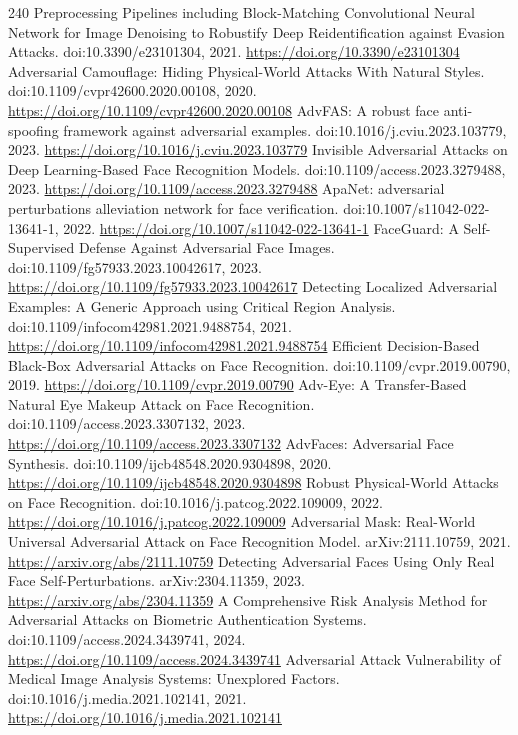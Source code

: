 \documentclass[11pt]{article}
\begin{document}
\begin{thebibliography}{240}
 Preprocessing Pipelines including Block-Matching Convolutional Neural Network for Image Denoising to Robustify Deep Reidentification against Evasion Attacks. doi:10.3390/e23101304, 2021. \url{https://doi.org/10.3390/e23101304}
 Adversarial Camouflage: Hiding Physical-World Attacks With Natural Styles. doi:10.1109/cvpr42600.2020.00108, 2020. \url{https://doi.org/10.1109/cvpr42600.2020.00108}
 AdvFAS: A robust face anti-spoofing framework against adversarial examples. doi:10.1016/j.cviu.2023.103779, 2023. \url{https://doi.org/10.1016/j.cviu.2023.103779}
 Invisible Adversarial Attacks on Deep Learning-Based Face Recognition Models. doi:10.1109/access.2023.3279488, 2023. \url{https://doi.org/10.1109/access.2023.3279488}
 ApaNet: adversarial perturbations alleviation network for face verification. doi:10.1007/s11042-022-13641-1, 2022. \url{https://doi.org/10.1007/s11042-022-13641-1}
 FaceGuard: A Self-Supervised Defense Against Adversarial Face Images. doi:10.1109/fg57933.2023.10042617, 2023. \url{https://doi.org/10.1109/fg57933.2023.10042617}
 Detecting Localized Adversarial Examples: A Generic Approach using Critical Region Analysis. doi:10.1109/infocom42981.2021.9488754, 2021. \url{https://doi.org/10.1109/infocom42981.2021.9488754}
 Efficient Decision-Based Black-Box Adversarial Attacks on Face Recognition. doi:10.1109/cvpr.2019.00790, 2019. \url{https://doi.org/10.1109/cvpr.2019.00790}
 Adv-Eye: A Transfer-Based Natural Eye Makeup Attack on Face Recognition. doi:10.1109/access.2023.3307132, 2023. \url{https://doi.org/10.1109/access.2023.3307132}
 AdvFaces: Adversarial Face Synthesis. doi:10.1109/ijcb48548.2020.9304898, 2020. \url{https://doi.org/10.1109/ijcb48548.2020.9304898}
 Robust Physical-World Attacks on Face Recognition. doi:10.1016/j.patcog.2022.109009, 2022. \url{https://doi.org/10.1016/j.patcog.2022.109009}
 Adversarial Mask: Real-World Universal Adversarial Attack on Face Recognition Model. arXiv:2111.10759, 2021. \url{https://arxiv.org/abs/2111.10759}
 Detecting Adversarial Faces Using Only Real Face Self-Perturbations. arXiv:2304.11359, 2023. \url{https://arxiv.org/abs/2304.11359}
 A Comprehensive Risk Analysis Method for Adversarial Attacks on Biometric Authentication Systems. doi:10.1109/access.2024.3439741, 2024. \url{https://doi.org/10.1109/access.2024.3439741}
 Adversarial Attack Vulnerability of Medical Image Analysis Systems: Unexplored Factors. doi:10.1016/j.media.2021.102141, 2021. \url{https://doi.org/10.1016/j.media.2021.102141}

\end{thebibliography}
\end{document}
